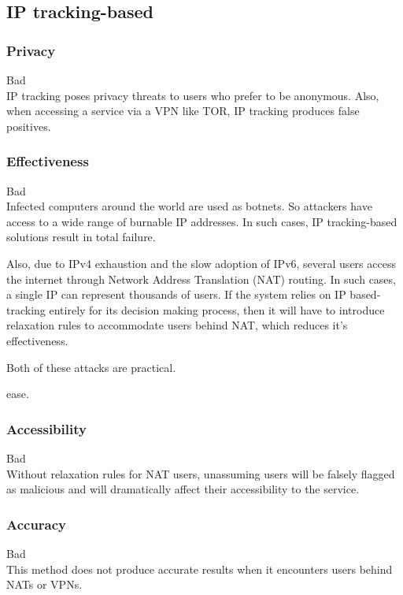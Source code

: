 \subsection{IP tracking-based}

\subsubsection{Privacy}
Bad\\
IP tracking poses privacy threats to users who prefer to be anonymous. Also,
when accessing a service via a VPN like TOR, IP tracking produces false
positives.

\subsubsection{Effectiveness}
Bad\\

Infected computers around the world are used as botnets. So attackers have
access to a wide range of burnable IP addresses. In such cases, IP tracking-based   
solutions result in total failure.

Also, due to IPv4 exhaustion and the slow adoption of IPv6, several users access
the internet through Network Address Translation (NAT) routing. In such cases, a
single IP can represent thousands of users. If the system relies on IP
based-tracking entirely for its decision making process, then it will have to
introduce relaxation rules to accommodate users behind NAT, which reduces it's
effectiveness.

Both of these attacks are practical.

ease.
\subsubsection{Accessibility}
Bad\\

Without relaxation rules for NAT users, unassuming users will be falsely flagged as
malicious and will dramatically affect their accessibility to the service.

\subsubsection{Accuracy}
Bad\\

This method does not produce accurate results when it encounters users behind
NATs or VPNs.
